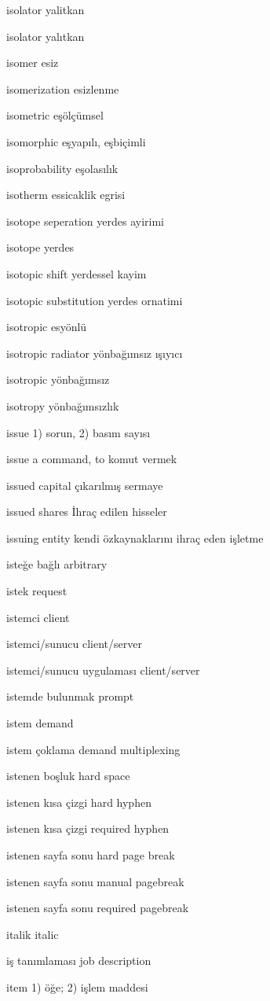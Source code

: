 \documentclass[12pt,fleqn]{article}\usepackage{../../common}
\begin{document}
isolator yalitkan

isolator yalıtkan

isomer esiz

isomerization esizlenme

isometric eşölçümsel

isomorphic eşyapılı, eşbiçimli

isoprobability eşolasılık

isotherm essicaklik egrisi

isotope seperation yerdes ayirimi

isotope yerdes

isotopic shift yerdessel kayim

isotopic substitution yerdes ornatimi

isotropic esyönlü

isotropic radiator yönbağımsız ışıyıcı

isotropic yönbağımsız

isotropy yönbağımsızlık

issue 1) sorun, 2) basım sayısı

issue a command, to komut vermek

issued capital çıkarılmış sermaye

issued shares İhraç edilen hisseler

issuing entity kendi özkaynaklarını ihraç eden işletme

isteğe bağlı arbitrary

istek request

istemci client

istemci/sunucu client/server

istemci/sunucu uygulaması client/server

istemde bulunmak prompt

istem demand

istem çoklama demand multiplexing

istenen boşluk hard space

istenen kısa çizgi hard hyphen

istenen kısa çizgi required hyphen

istenen sayfa sonu hard page break

istenen sayfa sonu manual pagebreak

istenen sayfa sonu required pagebreak

italik italic

iş tanımlaması job description

item 1) öğe; 2) işlem maddesi
\end{document}

